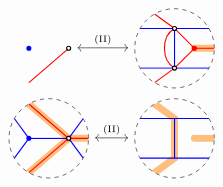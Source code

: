\begin{figure}[ht]
\[\begin{tikzcd}[row sep=0pc]
\begin{tikzpicture}[baseline=-.5ex]
\draw [red, thick] (-1/2,{-sqrt(3)/2}) -- (1/2,0);
\draw[thick,blue,fill=blue] (-1/2,0) circle (0.05);
\draw[thick,black,fill=white] (1/2,0) circle (0.05);
\end{tikzpicture}
\arrow[leftrightarrow,r,"\Move{II}"]&
\begin{tikzpicture}[baseline=-.5ex]
\draw [dashed] (3,0) circle [radius=1];%
\clip (3,0) circle (1);
\draw [color=cyclecolor1, line cap=round, line width=5, opacity=0.5] (3.5,0) to (4,0);
\draw [blue, thick] ({3-sqrt(3)/2},1/2)--({3+sqrt(3)/2},1/2);
\draw [blue, thick] ({3-sqrt(3)/2},-1/2)--({3+sqrt(3)/2},-1/2);
\draw [blue, thick] (3,1/2)--(3,-1/2);
\draw [red, thick] (5/2,{sqrt(3)/2})--(3,1/2) to[out=-150,in=150] (3,-1/2)--(5/2,{-sqrt(3)/2});
\draw [red, thick] (3,1/2)--(7/2,0) -- (4,0);
\draw [red, thick] (3,-1/2)--(7/2,0);

\draw[thick,black,fill=white] (3,1/2) circle (0.05);
\draw[thick,black,fill=white] (3,-1/2) circle (0.05);
\draw[thick,red,fill=red] (7/2,0) circle (0.05);
\end{tikzpicture}
\\
\begin{tikzpicture}[baseline=-.5ex]
\draw [dashed] (0,0) circle [radius=1];%
\clip (0,0) circle (1);
\draw [color=cyclecolor1, line cap=round, line width=5, opacity=0.5] (-1/2,{sqrt(3)/2}) -- (1/2,0)--(1,0);
\draw [color=cyclecolor1, line cap=round, line width=5, opacity=0.5] (-1/2,{-sqrt(3)/2}) -- (1/2,0);
\draw [blue, thick] ({-sqrt(3)/2},1/2)--(-1/2,0);
\draw [blue, thick] ({-sqrt(3)/2},-1/2)--(-1/2,0);
\draw [blue, thick] ({sqrt(3)/2},1/2)--(1/2,0);
\draw [blue, thick] ({sqrt(3)/2},-1/2)--(1/2,0);
\draw [blue, thick] (-1/2,0)--(1/2,0);

\draw [red, thick] (-1/2,{sqrt(3)/2}) -- (1/2,0)--(1,0);
\draw [red, thick] (-1/2,{-sqrt(3)/2}) -- (1/2,0);

\draw[thick,blue,fill=blue] (-1/2,0) circle (0.05);
\draw[thick,black,fill=white] (1/2,0) circle (0.05);
\end{tikzpicture}
\arrow[leftrightarrow,r,"\Move{II}"]&
\begin{tikzpicture}[baseline=-.5ex]
\draw [dashed] (3,0) circle [radius=1];%
\clip (3,0) circle (1);
\draw [color=cyclecolor1, line cap=round, line width=5, opacity=0.5] (5/2,{sqrt(3)/2})--(3,1/2)--(3,1/2)--(3,-1/2) -- (3,-1/2)--(5/2,{-sqrt(3)/2});
\draw [color=cyclecolor1, line cap=round, line width=5, opacity=0.5] (3.5,0)--(4,0);
\draw [blue, thick] ({3-sqrt(3)/2},1/2)--({3+sqrt(3)/2},1/2);
\draw [blue, thick] ({3-sqrt(3)/2},-1/2)--({3+sqrt(3)/2},-1/2);
\draw [blue, thick] (3,1/2)--(3,-1/2);


\end{tikzpicture}
\end{tikzcd}\]
\end{figure}
